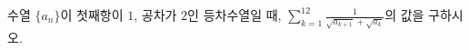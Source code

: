 수열 $\{a_n\}$이 첫째항이 $1$, 공차가 $2$인 등차수열일 때, $\displaystyle\sum_{k=1}^{12}\frac{1}{\sqrt{a_{k+1}}+\sqrt{a_k}}$의 값을 구하시오.
